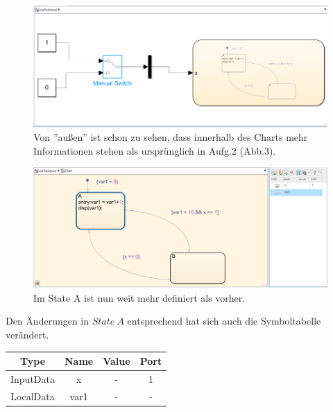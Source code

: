 \documentclass{article}
\begin{document}
		\subsection{}
			\begin{figure}[h]
				\centering
				\includegraphics[scale=0.5]{Aufgabe4.3d.png}
				\caption{Von ''außen'' ist schon zu sehen, dass innerhalb des Charts mehr Informationen stehen als ursprünglich in Aufg.2 (Abb.3).}
				\label{fig_9: Aufg_3d}
			\end{figure}
			\begin{figure}[h]
				\centering
				\includegraphics[scale=0.45]{Aufgabe4.3dChart.png}
				\caption{Im State A ist nun weit mehr definiert als vorher.}
				\label{fig_10: Aufg_3d_Chart}
			\end{figure}
			Den Änderungen in $State\ A$ entsprechend hat sich auch die Symboltabelle verändert.
			\begin{center}
			\begin{tabular}{| c | c | c | c |}
				\hline
				Type & Name & Value & Port\\
				\hline \hline
				InputData & x & - & 1\\
				\hline
				LocalData & var1 & - & -\\
				\hline
			\end{tabular}
		\end{center}	
\clearpage
\end{document}
